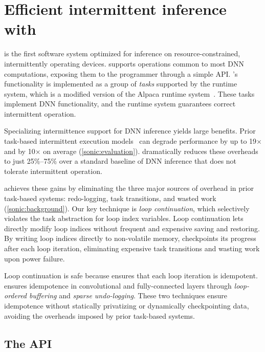 \section{Efficient intermittent inference with \sonic}
\label{sonic:sonic}

\sonic is the first software system optimized for inference on
resource-constrained, intermittently operating devices.
%
\sonic supports operations common to most DNN computations,
exposing them to the programmer through a simple API.
%
\sonic's functionality is implemented as a group of {\em tasks}
supported by the \sonic runtime system, which is a modified version of the
Alpaca runtime system~\cite{alpaca}.
%
These tasks implement DNN functionality, and the \sonic runtime system 
guarantees correct intermittent operation.

Specializing intermittence support for DNN inference yields large benefits.
Prior task-based intermittent execution models~\cite{alpaca,chain} can degrade performance by up to 19$\times$
and by 10$\times$ on average
(\autoref{sonic:evaluation}).
\sonic dramatically reduces these overheads to just 25\%--75\% over
a standard baseline of DNN inference that does not tolerate intermittent operation.

\sonic achieves these gains by eliminating the three major sources of overhead in prior task-based systems:
redo-logging, task transitions, and wasted work (\autoref{sonic:background}).
%
Our key technique is \emph{loop continuation},
which selectively violates the task abstraction
for loop index variables.
Loop continuation lets \sonic directly modify loop indices without frequent and expensive saving and restoring.
By writing loop indices directly to non-volatile memory,
\sonic checkpoints its progress after each loop iteration,
eliminating expensive task transitions
and wasting work upon power failure.

Loop continuation is safe because \sonic
ensures that each loop iteration is idempotent.
\sonic ensures idempotence 
in convolutional and fully-connected layers
through \emph{loop-ordered buffering} and \emph{sparse undo-logging}.
These two techniques ensure idempotence without statically privatizing or dynamically checkpointing data,
avoiding the overheads imposed by prior task-based systems.

\subsection{The \sonic API}

